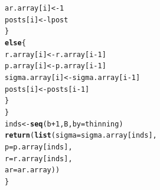 \documentclass{article}\usepackage[]{graphicx}\usepackage[]{color}
\makeatletter
\newcommand{\hlnum}[1]{\textcolor[rgb]{0.686,0.059,0.569}{#1}}%
\newcommand{\hlopt}[1]{\textcolor[rgb]{0,0,0}{#1}}%
\newcommand{\hlstd}[1]{\textcolor[rgb]{0.345,0.345,0.345}{#1}}%
\newcommand{\hlkwa}[1]{\textcolor[rgb]{0.161,0.373,0.58}{\textbf{#1}}}%
\newcommand{\hlkwb}[1]{\textcolor[rgb]{0.69,0.353,0.396}{#1}}%
\newcommand{\hlkwc}[1]{\textcolor[rgb]{0.333,0.667,0.333}{#1}}%
\newcommand{\hlkwd}[1]{\textcolor[rgb]{0.737,0.353,0.396}{\textbf{#1}}}%
\newenvironment{kframe}{%
 \def\at@end@of@kframe{}%
 \ifinner\ifhmode%
  \def\at@end@of@kframe{\end{minipage}}%
  \begin{minipage}{\columnwidth}%
 \fi\fi%
 \def\FrameCommand##1{\hskip\@totalleftmargin \hskip-\fboxsep
 \colorbox{shadecolor}{##1}\hskip-\fboxsep
     \hskip-\linewidth \hskip-\@totalleftmargin \hskip\columnwidth}%
 \MakeFramed {\advance\hsize-\width
   \@totalleftmargin\z@ \linewidth\hsize
   \@setminipage}}%
 {\par\unskip\endMakeFramed%
 \at@end@of@kframe}
\newenvironment{knitrout}{}{} %
\makeatother
\begin{document}
\begin{knitrout}
\begin{kframe}
\begin{alltt}
      \hlstd{ar.array[i]} \hlkwb{<-} \hlnum{1}
      \hlstd{posts[i]} \hlkwb{<-} \hlstd{lpost}
    \hlstd{\}}
    \hlkwa{else}\hlstd{\{}
      \hlstd{r.array[i]} \hlkwb{<-} \hlstd{r.array[i}\hlopt{-}\hlnum{1}\hlstd{]}
      \hlstd{p.array[i]} \hlkwb{<-} \hlstd{p.array[i}\hlopt{-}\hlnum{1}\hlstd{]}
      \hlstd{sigma.array[i]} \hlkwb{<-} \hlstd{sigma.array[i}\hlopt{-}\hlnum{1}\hlstd{]}
      \hlstd{posts[i]} \hlkwb{<-} \hlstd{posts[i}\hlopt{-}\hlnum{1}\hlstd{]}
    \hlstd{\}}
  \hlstd{\}}
  \hlstd{inds} \hlkwb{<-} \hlkwd{seq}\hlstd{(b}\hlopt{+}\hlnum{1}\hlstd{, B,} \hlkwc{by}\hlstd{=thinning)}
  \hlkwd{return}\hlstd{(}\hlkwd{list}\hlstd{(}\hlkwc{sigma}\hlstd{=sigma.array[inds],}
              \hlkwc{p}\hlstd{=p.array[inds],}
              \hlkwc{r}\hlstd{=r.array[inds],}
              \hlkwc{ar}\hlstd{=ar.array))}
\hlstd{\}}
\end{alltt}
\end{kframe}
\end{knitrout}
\end{document}

